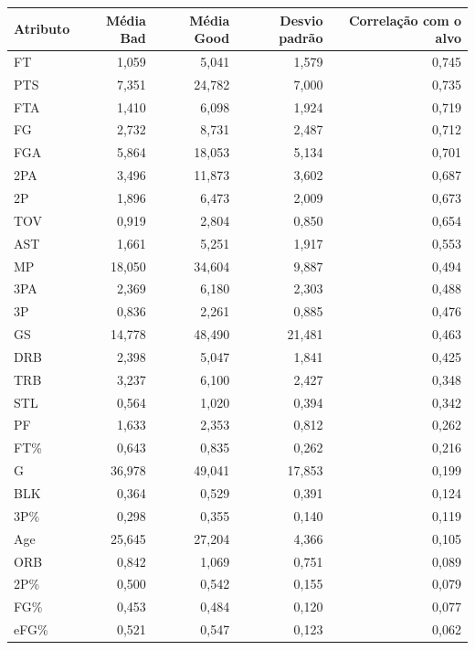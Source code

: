 \begin{tabular}{lrrrr}
\toprule
Atributo & Média Bad & Média Good & Desvio padrão & Correlação com o alvo \\
\midrule
FT & 1,059 & 5,041 & 1,579 & 0,745 \\
PTS & 7,351 & 24,782 & 7,000 & 0,735 \\
FTA & 1,410 & 6,098 & 1,924 & 0,719 \\
FG & 2,732 & 8,731 & 2,487 & 0,712 \\
FGA & 5,864 & 18,053 & 5,134 & 0,701 \\
2PA & 3,496 & 11,873 & 3,602 & 0,687 \\
2P & 1,896 & 6,473 & 2,009 & 0,673 \\
TOV & 0,919 & 2,804 & 0,850 & 0,654 \\
AST & 1,661 & 5,251 & 1,917 & 0,553 \\
MP & 18,050 & 34,604 & 9,887 & 0,494 \\
3PA & 2,369 & 6,180 & 2,303 & 0,488 \\
3P & 0,836 & 2,261 & 0,885 & 0,476 \\
GS & 14,778 & 48,490 & 21,481 & 0,463 \\
DRB & 2,398 & 5,047 & 1,841 & 0,425 \\
TRB & 3,237 & 6,100 & 2,427 & 0,348 \\
STL & 0,564 & 1,020 & 0,394 & 0,342 \\
PF & 1,633 & 2,353 & 0,812 & 0,262 \\
FT\% & 0,643 & 0,835 & 0,262 & 0,216 \\
G & 36,978 & 49,041 & 17,853 & 0,199 \\
BLK & 0,364 & 0,529 & 0,391 & 0,124 \\
3P\% & 0,298 & 0,355 & 0,140 & 0,119 \\
Age & 25,645 & 27,204 & 4,366 & 0,105 \\
ORB & 0,842 & 1,069 & 0,751 & 0,089 \\
2P\% & 0,500 & 0,542 & 0,155 & 0,079 \\
FG\% & 0,453 & 0,484 & 0,120 & 0,077 \\
eFG\% & 0,521 & 0,547 & 0,123 & 0,062 \\
\bottomrule
\end{tabular}
